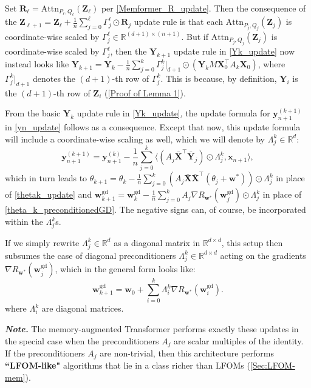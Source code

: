 \documentclass[11pt]{article}
\theoremstyle{plain}
\theoremstyle{definition}
\theoremstyle{remark}
\numberwithin{equation}{section}
\begin{document}
Set \(\mathbf{R}_\ell = \mathrm{Attn}_{P_\ell, Q_\ell}(\mathbf{Z}_\ell)\) per \eqref{Memformer_R_update}. Then the consequence of the \(\mathbf{Z}_{\ell+1} = \mathbf{Z}_\ell + \frac{1}{n} \sum_{j=0}^{\ell} \Gamma_j^\ell \odot \mathbf{R}_j\) update rule is that each \(\mathrm{Attn}_{P_j, Q_j}(\mathbf{Z}_j)\) is coordinate-wise scaled by \(\Gamma_j^\ell \in \mathbb{R}^{(d + 1) \times (n + 1)}\). But if \(\mathrm{Attn}_{P_j, Q_j}(\mathbf{Z}_j)\) is coordinate-wise scaled by \(\Gamma_j^\ell\), then the \(\mathbf{Y}_{k+1}\) update rule in \eqref{Yk_update} now instead looks like \(\mathbf{Y}_{k+1} = \mathbf{Y}_k - \frac{1}{n} \sum_{j=0}^{k} \Gamma_j^k \big|_{d+1} \odot (\mathbf{Y}_k M \mathbf{X}_0^\top A_k \mathbf{X}_0)\), where \(\Gamma_j^k \big|_{d+1}\) denotes the \((d + 1)\)-th row of \(\Gamma_j^k\). This is because, by definition, \(\mathbf{Y}_i\) is the \((d+1)\)-th row of \(\mathbf{Z}_i\) (\ref{Proof of Lemma 1}).

From the basic \(\mathbf{Y}_k\) update rule in \eqref{Yk_update}, the update formula for \(\mathbf{y}_{n+1}^{(k+1)}\) in \eqref{yn_update} follows as a consequence. Except that now, this update formula will include a coordinate-wise scaling as well, which we will denote by \(\Lambda_j^k \in \mathbb{R}^{d}\):
\[
\mathbf{y}_{n+1}^{(k+1)} = \mathbf{y}_{n+1}^{(k)} - \frac{1}{n} \sum_{j=0}^{k}\langle (A_j \mathbf{\bar{X}}^\top \mathbf{\bar{Y}}_j) \odot \Lambda_j^k, \mathbf{x}_{n+1} \rangle,
\label{scaled_yn_update}
\]
which in turn leads to \(\theta_{k+1} = \theta_k - \frac{1}{n} \sum_{j=0}^{k} (A_j \mathbf{\bar{X}} \mathbf{\bar{X}}^\top (\theta_j + \mathbf{w}^*)) \odot \Lambda_j^k\) in place of \eqref{thetak_update} and \(\mathbf{w}_{k+1}^{\text{gd}} = \mathbf{w}_k^{\text{gd}} - \frac{1}{n} \sum_{j=0}^{k} A_j \nabla R_{\mathbf{w}^*}(\mathbf{w}_j^{\text{gd}}) \odot \Lambda_j^k\) in place of \eqref{theta_k_preconditionedGD}. The negative signs can, of course, be incorporated within the \(\Lambda_j^k\)s.

If we simply rewrite \(\Lambda_j^k \in \mathbb R^{d}\) as a diagonal matrix in \(\mathbb R^{d \times d}\), this setup then subsumes the case of diagonal preconditioners \(\Lambda_j^k \in \mathbb R^{d \times d}\) acting on the gradients \( \nabla R_{\mathbf{w}^*}(\mathbf{w}_j^{\mathrm{gd}}) \), which in the general form looks like:
\[
    \mathbf{w}_{k+1}^{\mathrm{gd}} = \mathbf{w}_0 + \sum_{i=0}^k \Lambda_i^k \nabla R_{\mathbf{w}^*}(\mathbf{w}_i^{\mathrm{gd}}).
\]
where \(\Lambda_i^k\) are diagonal matrices.

\textbf{\textit{Note.}} The memory-augmented Transformer performs exactly these updates in the special case when the preconditioners \(A_j\) are scalar multiples of the identity. If the preconditioners \(A_j\) are non-trivial, then this architecture performs \textbf{``LFOM-like"} algorithms that lie in a class richer than LFOMs (\ref{Sec:LFOM-mem}).
\end{document}
